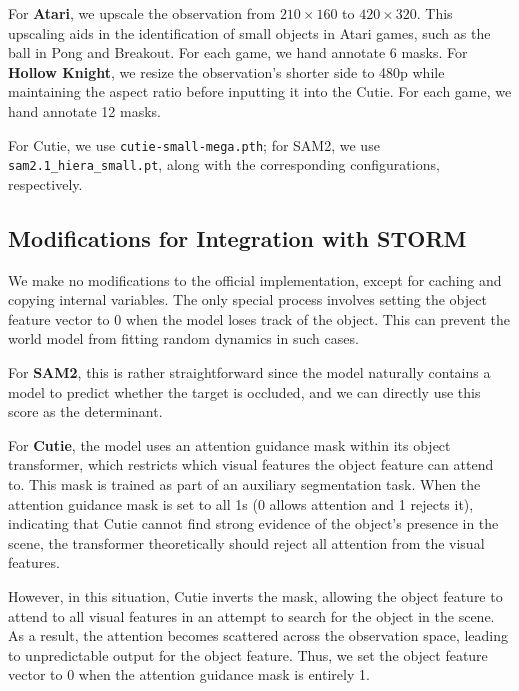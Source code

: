 For \textbf{Atari}, we upscale the observation from $210 \times 160$ to $420 \times 320$. 
This upscaling aids in the identification of small objects in Atari games, such as the ball in Pong and Breakout.
For each game, we hand annotate 6 masks.
For \textbf{Hollow Knight}, we resize the observation's shorter side to 480p while maintaining the aspect ratio before inputting it into the Cutie. 
For each game, we hand annotate 12 masks.

For Cutie, we use \texttt{cutie-small-mega.pth}; for SAM2, we use \texttt{sam2.1\_hiera\_small.pt}, along with the corresponding configurations, respectively.

\subsection{Modifications for Integration with STORM} \label{sec:video-model-modification}
We make no modifications to the official implementation, except for caching and copying internal variables.
The only special process involves setting the object feature vector to 0 when the model loses track of the object.
This can prevent the world model from fitting random dynamics in such cases.

For \textbf{SAM2}, this is rather straightforward since the model naturally contains a model to predict whether the target is occluded, and we can directly use this score as the determinant.

For \textbf{Cutie}, the model uses an attention guidance mask within its object transformer, which restricts which visual features the object feature can attend to.
This mask is trained as part of an auxiliary segmentation task.
When the attention guidance mask is set to all 1s (0 allows attention and 1 rejects it), indicating that Cutie cannot find strong evidence of the object's presence in the scene, the transformer theoretically should reject all attention from the visual features. 

However, in this situation, Cutie inverts the mask, allowing the object feature to attend to all visual features in an attempt to search for the object in the scene. 
As a result, the attention becomes scattered across the observation space, leading to unpredictable output for the object feature.
Thus, we set the object feature vector to 0 when the attention guidance mask is entirely 1.

\newpage
